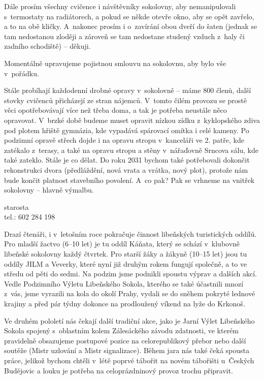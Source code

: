 \documentclass[11pt]{article}
\begin{document}
Dále prosím všechny cvičence i návštěvníky sokolovny, aby nemanipulovali s~termostaty na radiátorech, a pokud se někde otevře okno, aby se opět zavřelo, a to na obě kličky. A~nakonec prosím i o~zavírání obou dveří do šaten (jednak se tam nedostanou zloději a zároveň se tam nedostane studený vzduch z~haly či zadního schodiště) – děkuji.

Momentálně upravujeme pojistnou smlouvu na sokolovnu, aby bylo vše v~pořádku. 

Stále probíhají každodenní drobné opravy v~sokolovně – máme 800 členů, další stovky cvičenců přicházejí ze stran nájemců. V~tomto čilém provozu se prostě věci opotřebovávají více než třeba doma, a tak je potřeba neustále něco opravovat. V~brzké době budeme muset opravit nízkou zídku z~kyklopského zdiva pod plotem hřiště gymnázia, kde vypadává spárovací omítka i celé kameny. Po podzimní opravě střech dojde i na opravu stropu v~kanceláři ve 2. patře, kde zatékalo z~terasy, a také na opravu stropu a stěny v~nářaďovně Srncova sálu, kde také zateklo. Stále je co dělat. Do roku 2031 bychom také potřebovali dokončit rekonstrukci dvora (předláždění, nová vrata a vrátka, nový plot), protože nám bude končit platnost stavebního povolení.
A~co pak? Pak se vrhneme na vnitřek sokolovny – hlavně výmalbu.


\signature{Jiří Novák (Jirkan)}{starosta\\tel.: 602 284 198}

\vspace*{24pt}

Drazí čtenáři, i v~letošním roce pokračuje činnost libeňských turistických oddílů. Pro mladší žactvo (6–10 let) je tu oddíl Káňata, který se schází v~klubovně libeňské sokolovny každý čtvrtek. Pro starší žáky a žákyně (10–15 let) jsou tu oddíly JILM a Veverky, které nyní již druhým rokem fungují společně, a to ve středu od pěti do sedmi. Na podzim jsme podnikli spoustu výprav a dalších akcí. Vedle Podzimního Výletu Libeňského Sokola, kterého se také účastnili mnozí z~vás, jsme vyrazili na kola do okolí Prahy, vydali se do sněhem pokryté lednové krajiny a před pár týdny dokonce na prodloužený víkend na lyže do Krkonoš.

Ve druhém pololetí nás čekají další tradiční akce, jako je Jarní Výlet Libeňského Sokola spojený s~oblastním kolem Zálesáckého závodu zdatnosti, ve kterém pravidelně obsazujeme postupové pozice na celorepublikový přebor nebo další soutěže (Mistr uzlování a Mistr signalizace). Během jara nás také čeká spousta práce, jelikož bychom chtěli v~létě poprvé tábořit na novém tábořišti u~Českých Budějovic a louku je potřeba na celoprázdninový provoz trochu připravit.
\end{document}
